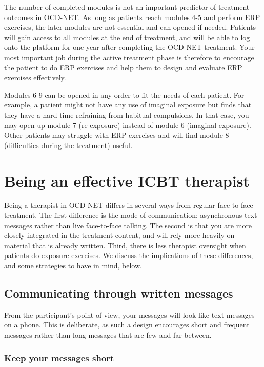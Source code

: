 \documentclass[]{book}
\theoremstyle{definition}
\theoremstyle{definition}
\theoremstyle{definition}
\theoremstyle{remark}
\begin{document}
The number of completed modules is not an important predictor of
treatment outcomes in OCD-NET. As long as patients reach modules 4-5 and
perform ERP exercises, the later modules are not essential and can
opened if needed. Patients will gain access to all modules at the end of
treatment, and will be able to log onto the platform for one year after
completing the OCD-NET treatment. Your most important job during the
active treatment phase is therefore to encourage the patient to do ERP
exercises and help them to design and evaluate ERP exercises
effectively.

Modules 6-9 can be opened in any order to fit the needs of each patient.
For example, a patient might not have any use of imaginal exposure but
finds that they have a hard time refraining from habitual compulsions.
In that case, you may open up module 7 (re-exposure) instead of module 6
(imaginal exposure). Other patients may struggle with ERP exercises and
will find module 8 (difficulties during the treatment) useful.

\hypertarget{being-an-effective-icbt-therapist}{%
\section{Being an effective ICBT
therapist}\label{being-an-effective-icbt-therapist}}

Being a therapist in OCD-NET differs in several ways from regular
face-to-face treatment. The first difference is the mode of
communication: asynchronous text messages rather than live face-to-face
talking. The second is that you are more closely integrated in the
treatment content, and will rely more heavily on material that is
already written. Third, there is less therapist oversight when patients
do exposure exercises. We discuss the implications of these differences,
and some strategies to have in mind, below.

\hypertarget{communicating-through-written-messages}{%
\subsection{Communicating through written
messages}\label{communicating-through-written-messages}}

From the participant's point of view, your messages will look like text
messages on a phone. This is deliberate, as such a design encourages
short and frequent messages rather than long messages that are few and
far between.

\hypertarget{keep-your-messages-short}{%
\subsubsection{Keep your messages
short}\label{keep-your-messages-short}}
\end{document}
